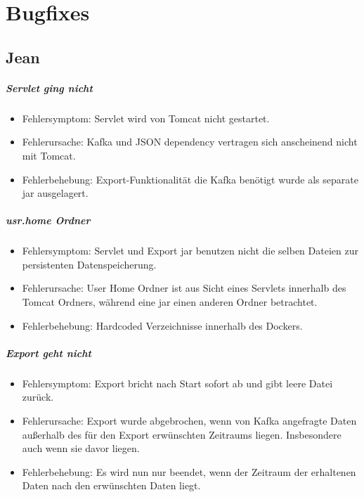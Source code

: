 \chapter{Bugfixes}

\section{Jean}
\paragraph{Servlet ging nicht}
\begin{itemize}
	\item Fehlersymptom: Servlet wird von Tomcat nicht gestartet.
	\item Fehlerursache: Kafka und JSON dependency vertragen sich anscheinend nicht mit Tomcat.
	\item Fehlerbehebung: Export-Funktionalität die Kafka benötigt wurde als separate jar ausgelagert.
\end{itemize}

\paragraph{usr.home Ordner}
\begin{itemize}
	\item Fehlersymptom: Servlet und Export jar benutzen nicht die selben Dateien zur persistenten Datenspeicherung.
	\item Fehlerursache: User Home Ordner ist aus Sicht eines Servlets innerhalb des Tomcat Ordners, während eine jar einen anderen Ordner betrachtet.
	\item Fehlerbehebung: Hardcoded Verzeichnisse innerhalb des Dockers.
\end{itemize}

\paragraph{Export geht nicht}
\begin{itemize}
	\item Fehlersymptom: Export bricht nach Start sofort ab und gibt leere Datei zurück.
	\item Fehlerursache: Export wurde abgebrochen, wenn von Kafka angefragte Daten außerhalb des für den Export erwünschten Zeitraums liegen. Insbesondere auch wenn sie davor liegen.
	\item Fehlerbehebung: Es wird nun nur beendet, wenn der Zeitraum der erhaltenen Daten nach den erwünschten Daten liegt.
\end{itemize}


